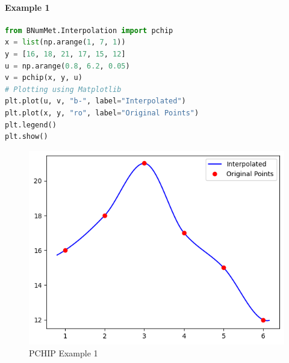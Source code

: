 \paragraph{Example 1}{
\begin{lstlisting}[language=Python]
from BNumMet.Interpolation import pchip
x = list(np.arange(1, 7, 1))
y = [16, 18, 21, 17, 15, 12]
u = np.arange(0.8, 6.2, 0.05)
v = pchip(x, y, u)
# Plotting using Matplotlib
plt.plot(u, v, "b-", label="Interpolated")
plt.plot(x, y, "ro", label="Original Points")
plt.legend()
plt.show()
\end{lstlisting}

\begin{figure}[H]
    \centering
    \includegraphics{Include/Images/Thesis/Documentation/Interpolation/PCHIP Example 1.png}
    \caption{PCHIP Example 1}
    \label{fig:PCHIP Example 1}
\end{figure}
}